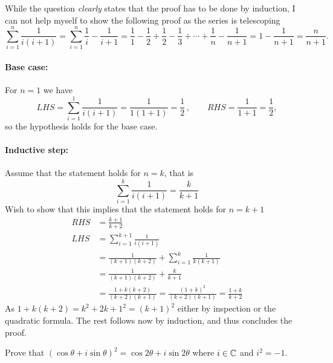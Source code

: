 \documentclass[a4paper, english, 12pt]{article} %
\begin{document}
\begin{answer}
  While the question \emph{clearly} states that the proof has to be done by
  induction, I can not help myself to show the following proof as the series is
  telescoping
  \begin{equation*}
    \sum_{i = 1}^n \frac{1}{i(i+1)}
    = \sum_{i=1}^n \frac{1}{i} - \frac{1}{i+1}
    = \frac{1}{1} - \frac{1}{2} + \frac{1}{2} - \frac{1}{3} + \cdots
    + \frac{1}{n} - \frac{1}{n+1}
    = 1 - \frac{1}{n+1} = \frac{n}{n+1}.
  \end{equation*}
  \paragraph{Base case:} For $n=1$ we have
  \begin{equation*}
    LHS = \sum_{i=1}^1 \frac{1}{i(i+1)} = \frac{1}{1(1+1)} = \frac{1}{2}\,, \qquad
    RHS = \frac{1}{1+1} = \frac{1}{2},
  \end{equation*}
  so the hypothesis holds for the base case.
  \paragraph{Inductive step:} Assume that the statement holds for $n=k$, that is
  \begin{equation*}
    \sum_{i = 1}^k \frac{1}{i(i+1)} = \frac{k}{k+1}
  \end{equation*}
  Wish to show that this implies that the statement holds for $n=k+1$
  \begin{align*}
    RHS & = \frac{k+1}{k+2} \\
    LHS & = \sum_{i = 1}^{k+1} \frac{1}{i(i+1)} \\
        & = \frac{1}{(k+1)(k+2)} + \sum_{i=1}^{k} \frac{1}{k(k+1)} \\
        & = \frac{1}{(k+1)(k+2)} + \frac{k}{k+1} \\
        & = \frac{1 + k(k+2)}{(k+2)(k+1)} 
          = \frac{(1+k)^2}{(k+2)(k+1)} = \frac{1+k}{k+2}
  \end{align*}
  As $1 + k(k+2) = k^2 + 2k + 1^2 = (k+1)^2$ either by inspection or
  the quadratic formula. The rest follows now by induction, and thus concludes
  the proof.
\end{answer}


\begin{problem}[12]
  \begin{subproblem}
    \label{subproblem:12a}
    Prove that $(\cos \theta + i \sin \theta)^2 = \cos 2\theta + i \sin
    2\theta$ where $i \in \mathbb{C}$ and $i^2 = -1$.
  \end{subproblem}
\end{problem}
\end{document}
